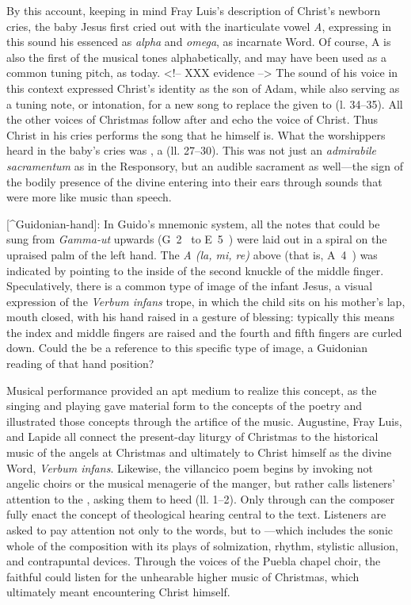 \noindent
By this account, keeping in mind Fray Luis's description of Christ's newborn
cries, the baby Jesus first cried out with the inarticulate vowel \emph{A},
expressing in this sound his essenced as \emph{alpha} and \emph{omega}, as incarnate Word.
Of course, A is also the first of the musical tones alphabetically, and may have
been used as a common tuning pitch, as today.
<!-- XXX  evidence  -->
The sound of his voice in this context expressed Christ's identity as the son of
Adam, while also serving as a tuning note, or intonation, for a new song to
replace the  given to  (l. 34--35).
All the other voices of Christmas follow after and echo the voice of Christ.
Thus Christ in his cries performs the song that he himself is.
What the worshippers heard in the baby's cries was , a  (ll.
27--30).
This was not just an \emph{admirabile sacramentum} as in the Responsory, but an
audible sacrament as well---the sign of the bodily presence of the divine
entering into their ears through sounds that were more like music than speech.

[^Guidonian-hand]:
In Guido's mnemonic system, all the notes that could be sung from \emph{Gamma-ut}
upwards (G~2~ to E~5~) were laid out in a spiral on the upraised palm of the
left hand.
The \emph{A (la, mi, re)} above  (that is, A~4~) was indicated by pointing
to the inside of the second knuckle of the middle finger.
Speculatively, there is a common type of image of the infant Jesus, a visual
expression of the \emph{Verbum infans} trope, in which the child sits on his mother's
lap, mouth closed, with his hand raised in a gesture of blessing: typically this
means the index and middle fingers are raised and the fourth and fifth fingers
are curled down.
Could the  be a reference to this specific type of image, a Guidonian
reading of that hand position?


Musical performance provided an apt medium to realize this concept, as the
singing and playing gave material form to the concepts of the poetry and
illustrated those concepts through the artifice of the music.
Augustine, Fray Luis, and Lapide all connect the present-day liturgy of
Christmas to the historical music of the angels at Christmas and ultimately to
Christ himself as the divine Word, \emph{Verbum infans}.
Likewise, the villancico poem begins by invoking not angelic choirs or the
musical menagerie of the manger, but rather calls listeners' attention to the
, asking them to heed  (ll. 1--2).
Only through  can the composer fully enact the
concept of theological hearing central to the text.
Listeners are asked to pay attention not only to the words, but to ---which includes the sonic whole of the composition with its plays of
solmization, rhythm, stylistic allusion, and contrapuntal devices.
Through the voices of the Puebla chapel choir, the faithful could listen for the
unhearable higher music of Christmas, which ultimately meant encountering Christ
himself.


